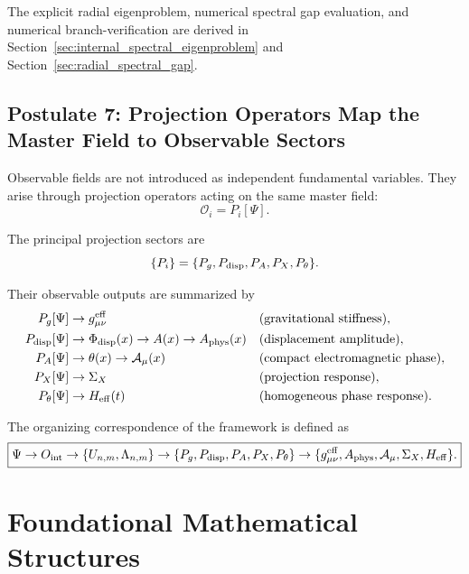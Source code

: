 \documentclass[11pt]{article}
\begin{document}
The explicit radial eigenproblem, numerical spectral gap evaluation, and numerical branch-verification are derived in Section~\ref{sec:internal_spectral_eigenproblem} and Section~\ref{sec:radial_spectral_gap}.

\subsection{Postulate 7: Projection Operators Map the Master Field to Observable Sectors}
\label{sec:postulate_projection_operators_observable_sectors}

Observable fields are not introduced as independent fundamental variables. They arise through projection operators \cite{vonneumann1932, GelfandNaimark1943, Segal1947} acting on the same master field:
\begin{equation}
\mathcal O_i=P_i[\Psi].
\end{equation}

The principal projection sectors are
\begin{equation}
\{P_i\}
=
\{P_g,P_{\rm disp},P_A,P_X,P_\theta\}.
\end{equation}

Their observable outputs are summarized by
\begin{align}
P_g[\Psi]
&\rightarrow
g_{\mu\nu}^{\rm eff}
&&
\text{(gravitational stiffness)},\\
P_{\rm disp}[\Psi]
&\rightarrow
\Phi_{\rm disp}(x)
\rightarrow
A(x)
\rightarrow
A_{\rm phys}(x)
&&
\text{(displacement amplitude)},\\
P_A[\Psi]
&\rightarrow
\theta(x)
\rightarrow
\mathcal A_\mu(x)
&&
\text{(compact electromagnetic phase)},\\
P_X[\Psi]
&\rightarrow
\Sigma_X
&&
\text{(projection response)},\\
P_\theta[\Psi]
&\rightarrow
H_{\rm eff}(t)
&&
\text{(homogeneous phase response)}.
\end{align}

The organizing correspondence of the framework is defined as
\begin{equation}
\boxed{
\Psi
\rightarrow
O_{\rm int}
\rightarrow
\{U_{n,m},\Lambda_{n,m}\}
\rightarrow
\{P_g,P_{\rm disp},P_A,P_X,P_\theta\}
\rightarrow
\{g_{\mu\nu}^{\rm eff},A_{\rm phys},\mathcal A_\mu,\Sigma_X,H_{\rm eff}\}.
}
\end{equation}

\section{Foundational Mathematical Structures}
\label{sec:foundational_mathematical_structures}
\end{document}
